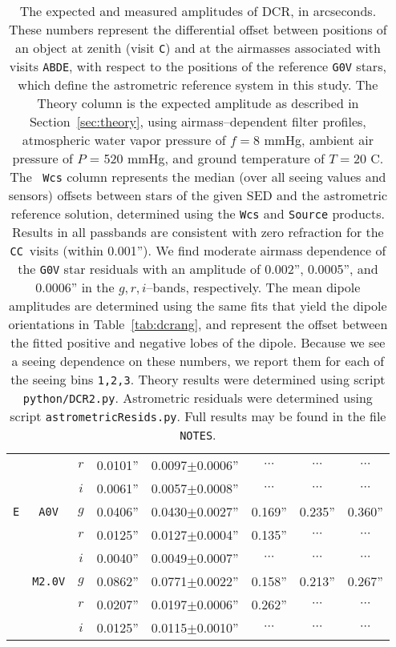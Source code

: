 \documentclass[prd, nofootinbib, floatfix, 11pt, tightenlines, times]{article}
\def\A{{\tt A}}
\def\B{{\tt B}}
\def\C{{\tt C}}
\def\D{{\tt D}}
\def\E{{\tt E}}
\begin{document}
\begin{table}
\begin{tabular}{cccccccc}
   &             & $r$ & 0.0101'' & 0.0097$\pm$0.0006'' & $\cdots$ & $\cdots$ & $\cdots$ \\ 
   &             & $i$ & 0.0061'' & 0.0057$\pm$0.0008'' & $\cdots$ & $\cdots$ & $\cdots$ \\
\hline
\E & {\tt A0V}   & $g$ & 0.0406'' & 0.0430$\pm$0.0027'' & 0.169''  & 0.235''  & 0.360''  \\
   &             & $r$ & 0.0125'' & 0.0127$\pm$0.0004'' & 0.135''  & $\cdots$ & $\cdots$ \\
   &             & $i$ & 0.0040'' & 0.0049$\pm$0.0007'' & $\cdots$ & $\cdots$ & $\cdots$ \\
   & {\tt M2.0V} & $g$ & 0.0862'' & 0.0771$\pm$0.0022'' & 0.158''  & 0.213''  & 0.267''  \\
   &             & $r$ & 0.0207'' & 0.0197$\pm$0.0006'' & 0.262''  & $\cdots$ & $\cdots$ \\
   &             & $i$ & 0.0125'' & 0.0115$\pm$0.0010'' & $\cdots$ & $\cdots$ & $\cdots$ \\
\end{tabular}
\caption[So I can have 2 paragraphs]{The expected and measured
  amplitudes of DCR, in arcseconds.  These numbers represent the
  differential offset between positions of an object at zenith (visit
  \C) and at the airmasses associated with visits \A\B\D\E, with
  respect to the positions of the reference {\tt G0V} stars, which
  define the astrometric reference system in this study.  The Theory
  column is the expected amplitude as described in
  Section~\ref{sec:theory}, using airmass--dependent filter profiles,
  atmospheric water vapor pressure of $f=8$ mmHg, ambient air pressure
  of $P$ = 520 mmHg, and ground temperature of $T=20$ C.  The {\tt
    Wcs} column represents the median (over all seeing values and
  sensors) offsets between stars of the given SED and the astrometric
  reference solution, determined using the {\tt Wcs} and {\tt Source}
  products.  Results in all passbands are consistent with zero
  refraction for the \C\C\ visits (within 0.001'').  We find moderate
  airmass dependence of the {\tt G0V} star residuals with an amplitude
  of 0.002'', 0.0005'', and 0.0006'' in the $g,r,i$--bands,
  respectively.  The mean dipole amplitudes are determined using the
  same fits that yield the dipole orientations in
  Table~\ref{tab:dcrang}, and represent the offset between the fitted
  positive and negative lobes of the dipole.  Because we see a seeing
  dependence on these numbers, we report them for each of the seeing
  bins {\tt 1,2,3}.  Theory results were determined using script {\tt
    python/DCR2.py}.  Astrometric residuals were determined using
  script {\tt astrometricResids.py}.  Full results may be found in the
  file {\tt NOTES}.}
\label{tab:dcramp}
\end{table}
\end{document}
